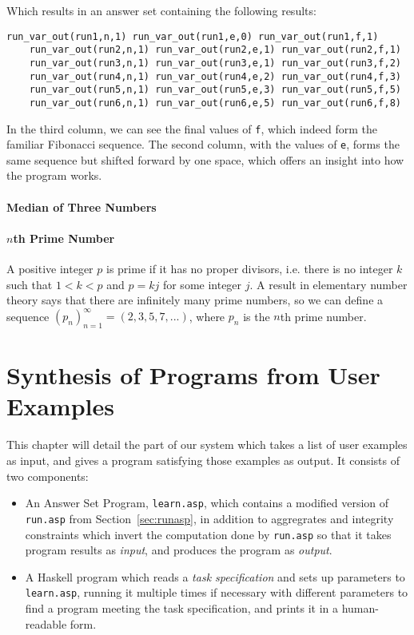\documentclass[a4paper,twoside,notitlepage]{report}
\begin{document}
Which results in an answer set containing the following results:
\begin{Verbatim}[samepage=true]
    run_var_out(run1,n,1) run_var_out(run1,e,0) run_var_out(run1,f,1)
    run_var_out(run2,n,1) run_var_out(run2,e,1) run_var_out(run2,f,1) 
    run_var_out(run3,n,1) run_var_out(run3,e,1) run_var_out(run3,f,2)
    run_var_out(run4,n,1) run_var_out(run4,e,2) run_var_out(run4,f,3)
    run_var_out(run5,n,1) run_var_out(run5,e,3) run_var_out(run5,f,5)
    run_var_out(run6,n,1) run_var_out(run6,e,5) run_var_out(run6,f,8)
\end{Verbatim}
In the third column, we can see the final values of \verb|f|, which indeed 
form the familiar Fibonacci sequence. The second column, with the values 
of \verb|e|, forms the same sequence but shifted forward by one space, 
which offers an insight into how the program works.

\subsubsection{Median of Three Numbers}

\subsubsection{$n$th Prime Number}
A positive integer $p$ is prime if it has no proper divisors, i.e. there 
is no integer $k$ such that $1<k<p$ and $p=kj$ for some integer $j$. A 
result in elementary number theory says that there are infinitely many 
prime numbers, so we can define a sequence $(p_n)_{n=1}^\infty=(2, 3, 5, 
7, ...)$, where $p_n$ is the $n$th prime number.

\chapter{Synthesis of Programs from User Examples} \label{chp:synexm}

This chapter will detail the part of our system which takes a list of user 
examples as input, and gives a program satisfying those examples as 
output. It consists of two components:
\begin{itemize}
    \item An Answer Set Program, \verb|learn.asp|, which contains a 
    modified version of \verb|run.asp| from Section~\ref{sec:runasp}, in 
    addition to aggregrates and integrity constraints which invert the 
    computation done by \verb|run.asp| so that it takes program results as 
    \emph{input}, and produces the program as \emph{output}.

    \item A Haskell program which reads a \emph{task specification} and 
    sets up parameters to \verb|learn.asp|, running it multiple times if 
    necessary with different parameters to find a program meeting the task 
    specification, and prints it in a human-readable form.
\end{itemize}
\end{document}
